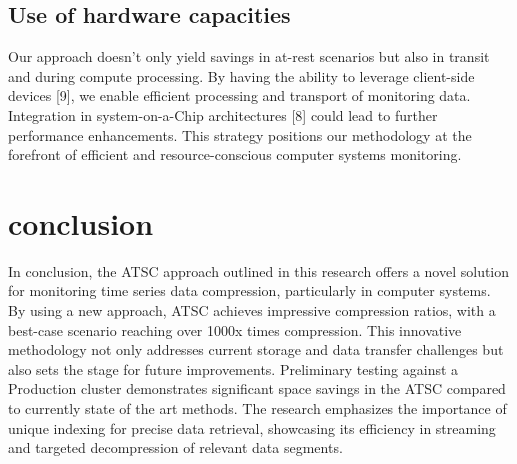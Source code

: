 \documentclass[conference]{IEEEtran}
\begin{document}

\subsection{Use of hardware capacities}

Our approach doesn't only yield savings in at-rest scenarios but also in transit and during compute processing.
By having the ability to leverage client-side devices [9], we enable efficient processing and transport of monitoring data. 
Integration in system-on-a-Chip architectures [8] could lead to further performance enhancements. 
This strategy positions our methodology at the forefront of efficient and resource-conscious computer systems monitoring.

\section{conclusion}

In conclusion, the ATSC approach outlined in this research offers a novel solution for monitoring time series data compression, particularly in computer systems. By using a new approach, ATSC achieves impressive compression ratios, with a best-case scenario reaching over 1000x times compression. This innovative methodology not only addresses current storage and data transfer challenges but also sets the stage for future improvements.
\vspace{5pt}
Preliminary testing against a Production cluster demonstrates significant space savings in the ATSC compared to currently state of the art methods. The research emphasizes the importance of unique indexing for precise data retrieval, showcasing its efficiency in streaming and targeted decompression of relevant data segments.
\end{document}
